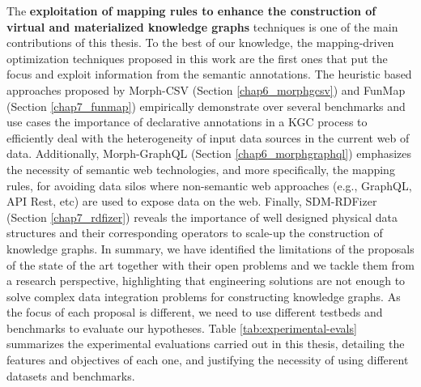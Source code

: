 The \textbf{exploitation of mapping rules to enhance the construction of virtual and materialized knowledge graphs} techniques is one of the main contributions of this thesis. To the best of our knowledge, the mapping-driven optimization techniques proposed in this work are the first ones that put the focus and exploit information from the semantic annotations. The heuristic based approaches proposed by Morph-CSV (Section \ref{chap6_morphgcsv}) and FunMap (Section \ref{chap7_funmap}) empirically demonstrate over several benchmarks and use cases the importance of declarative annotations in a KGC process to efficiently deal with the heterogeneity of input data sources in the current web of data. Additionally, Morph-GraphQL (Section \ref{chap6_morphgraphql}) emphasizes the necessity of semantic web technologies, and more specifically, the mapping rules, for avoiding data silos where non-semantic web approaches (e.g., GraphQL, API Rest, etc) are used to expose data on the web. Finally, SDM-RDFizer (Section \ref{chap7_rdfizer}) reveals the importance of well designed physical data structures and their corresponding operators to scale-up the construction of knowledge graphs. In summary, we have identified the limitations of the proposals of the state of the art together with their open problems and we tackle them from a research perspective, highlighting that engineering solutions are not enough to solve complex data integration problems for constructing knowledge graphs. As the focus of each proposal is different, we need to use different testbeds and benchmarks to evaluate our hypotheses. Table \ref{tab:experimental-evals} summarizes the experimental evaluations carried out in this thesis, detailing the features and objectives of each one, and justifying the necessity of using different datasets and benchmarks.

